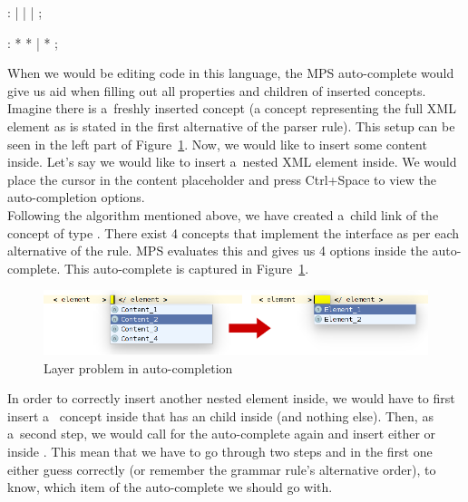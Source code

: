\begin{antlr}
	    :   
           |   
           |   
           |   
           ;

	    :   \literal{<}  * \literal{>} * \literal{</}  \literal{>}
           |   \literal{<}  * \literal{/>}
           ;
\end{antlr}

When we would be editing code in this language, the MPS auto-complete would give us aid when filling out all properties and children of inserted concepts.
Imagine there is a~freshly inserted  concept (a concept representing the full XML element as is stated in the first alternative of the  parser rule).
This setup can be seen in the left part of Figure~\ref{fig:layer_problem}.
Now, we would like to insert some content inside.
Let's say we would like to insert a~nested XML element inside.
We would place the cursor in the content placeholder and press Ctrl+Space to view the auto-completion options.
\\

Following the algorithm mentioned above, we have created a~child link of the  concept of type .
There exist 4 concepts that implement the  interface as per each alternative of the rule.
MPS evaluates this and gives us 4 options inside the auto-complete.
This auto-complete is captured in Figure~\ref{fig:layer_problem}.

\begin{figure}[h]
	\centering
	\includegraphics[width=\textwidth]{./img/layer_problem.png}
	\caption{Layer problem in auto-completion}
	\label{fig:layer_problem}
\end{figure}

In order to correctly insert another nested element inside, we would have to first insert a~ concept inside  that has an  child inside (and nothing else).
Then, as a~second step, we would call for the auto-complete again and insert either  or  inside .
This mean that we have to go through two steps and in the first one either guess correctly (or remember the grammar rule's alternative order), to know, which item of the auto-complete we should go with.
\\

